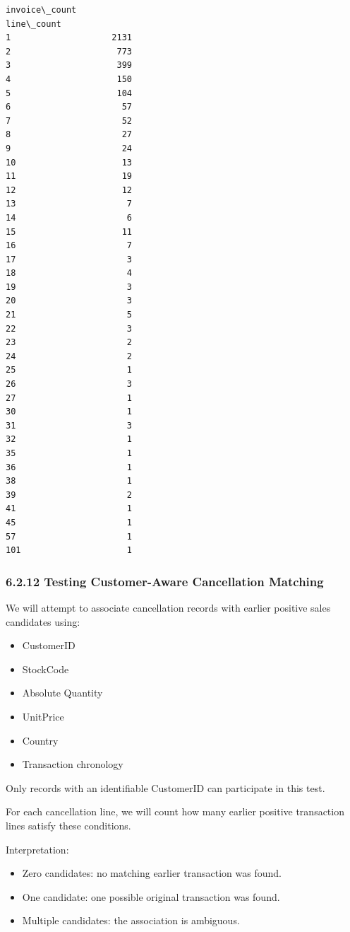 \documentclass[11pt]{article}
\providecommand{\tightlist}{%
      \setlength{\itemsep}{0pt}\setlength{\parskip}{0pt}}
\begin{document}
    
    \begin{Verbatim}[commandchars=\\\{\}]
            invoice\_count
line\_count               
1                    2131
2                     773
3                     399
4                     150
5                     104
6                      57
7                      52
8                      27
9                      24
10                     13
11                     19
12                     12
13                      7
14                      6
15                     11
16                      7
17                      3
18                      4
19                      3
20                      3
21                      5
22                      3
23                      2
24                      2
25                      1
26                      3
27                      1
30                      1
31                      3
32                      1
35                      1
36                      1
38                      1
39                      2
41                      1
45                      1
57                      1
101                     1
    \end{Verbatim}

    
    \subsubsection{6.2.12 Testing Customer-Aware Cancellation
Matching}\label{testing-customer-aware-cancellation-matching}

We will attempt to associate cancellation records with earlier positive
sales candidates using:

\begin{itemize}
\tightlist
\item
  CustomerID
\item
  StockCode
\item
  Absolute Quantity
\item
  UnitPrice
\item
  Country
\item
  Transaction chronology
\end{itemize}

Only records with an identifiable CustomerID can participate in this
test.

For each cancellation line, we will count how many earlier positive
transaction lines satisfy these conditions.

Interpretation:

\begin{itemize}
\tightlist
\item
  Zero candidates: no matching earlier transaction was found.
\item
  One candidate: one possible original transaction was found.
\item
  Multiple candidates: the association is ambiguous.
\end{itemize}
\end{document}
